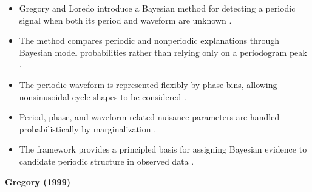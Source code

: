 \documentclass{book}
\providecommand{\ProjectDeepHeading}[2]{%
    \par\medskip\noindent\textbf{#2}\par\smallskip
}
\begin{document}
\begin{itemize}

    \item Gregory and Loredo introduce a Bayesian method for detecting a periodic signal when both its period and waveform are unknown \citep{gregory-1992-a-new-method-for-the-detection-of-a-periodic-signal-of-unknown-shape-and-period}.

    \item The method compares periodic and nonperiodic explanations through Bayesian model probabilities rather than relying only on a periodogram peak \citep{gregory-1992-a-new-method-for-the-detection-of-a-periodic-signal-of-unknown-shape-and-period}.

    \item The periodic waveform is represented flexibly by phase bins, allowing nonsinusoidal cycle shapes to be considered \citep{gregory-1992-a-new-method-for-the-detection-of-a-periodic-signal-of-unknown-shape-and-period}.

    \item Period, phase, and waveform-related nuisance parameters are handled probabilistically by marginalization \citep{gregory-1992-a-new-method-for-the-detection-of-a-periodic-signal-of-unknown-shape-and-period}.

    \item The framework provides a principled basis for assigning Bayesian evidence to candidate periodic structure in observed data \citep{gregory-1992-a-new-method-for-the-detection-of-a-periodic-signal-of-unknown-shape-and-period}.

\end{itemize}

\ProjectDeepHeading{5}{Gregory (1999)}
\end{document}
